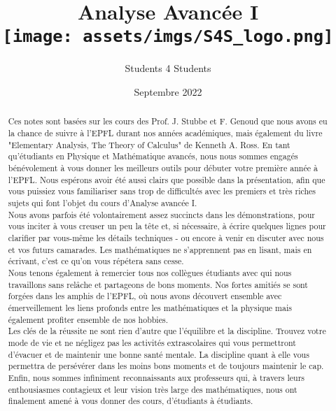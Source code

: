 \documentclass[oneside,11pt,french,table]{book}
\title{
    Analyse Avancée I \\ \vspace{0.5cm}
    \texttt{[image: assets/imgs/S4S\_logo.png]}
}
\author{Students 4 Students}
\date{Septembre 2022}
\theoremstyle{definition}
\theoremstyle{plain}
\theoremstyle{remark}
\begin{document}
\maketitle
\begin{abstract}
    Ces notes sont basées sur les cours des Prof. J. Stubbe et F. Genoud que nous avons eu la chance de suivre à l'EPFL durant nos années académiques, mais également du livre "Elementary Analysis, The Theory of Calculus" de Kenneth A. Ross. En tant qu'étudiants en Physique et Mathématique avancés, nous nous sommes engagés bénévolement à vous donner les meilleurs outils pour débuter votre première année à l'EPFL.  Nous espérons avoir été aussi clairs que possible dans la présentation, afin que vous puissiez vous familiariser sans trop de difficultés avec les premiers et très riches sujets qui font l'objet du cours d'Analyse avancée I.  \\
    
  Nous avons  parfois été volontairement assez succincts dans les démonstrations, pour vous inciter à vous creuser un peu la tête et, si nécessaire, à écrire quelques lignes pour clarifier par vous-même les détails techniques - ou encore à venir en discuter avec nous et vos futurs camarades. Les mathématiques ne s'apprennent pas en lisant, mais en écrivant, c'est ce qu'on vous répétera  sans cesse. \\
  
Nous tenons également à remercier tous nos collègues étudiants avec qui nous travaillons sans relâche et partageons de bons moments.  Nos fortes amitiés se sont forgées dans les amphis de l'EPFL, où nous avons découvert ensemble avec émerveillement les liens profonds entre les mathématiques et la physique mais également profiter ensemble de nos hobbies.\\

Les clés de la réussite ne sont rien d'autre que l'équilibre et la discipline. Trouvez votre mode de vie et ne négligez pas les activités extrascolaires qui vous permettront d'évacuer et de maintenir une bonne santé mentale. La discipline quant à elle vous permettra de persévérer dans les moins bons moments et de toujours maintenir le cap. \\

Enfin, nous sommes infiniment reconnaissants aux professeurs qui, à travers leurs enthousiasmes contagieux et leur vision très large des mathématiques, nous ont finalement amené à vous donner des cours, d'étudiants à étudiants. \paragraph{}

\end{abstract}
\end{document}
